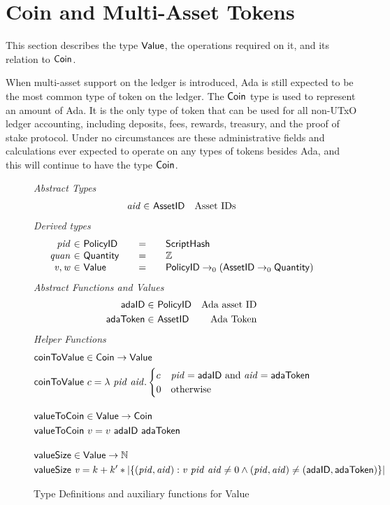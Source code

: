 \section{Coin and Multi-Asset Tokens}
\label{sec:coin-ma}

This section describes the type $\mathsf{Value}$, the operations required on
it, and its relation to $\mathsf{Coin}$.

When multi-asset support on the ledger is introduced, Ada is still expected to be
the most common type of token on the ledger.
The $\mathsf{Coin}$ type is used to represent an amount of Ada.
It is the only
type of token that can be used for all non-UTxO ledger accounting, including deposits,
fees, rewards, treasury, and the proof of stake protocol. Under no circumstances
are these administrative fields and calculations ever expected to operate on
any types of tokens besides Ada, and this will continue to have the type $\mathsf{Coin}$.

\begin{figure*}[t!]
  \emph{Abstract Types}
  \begin{align*}
    \mathit{aid} \in& ~\mathsf{AssetID} & \text{Asset IDs}
  \end{align*}
  \emph{Derived types}
  \begin{equation*}
    \begin{array}{r@{~\in~}l@{\qquad=\qquad}lr}
      \var{pid} & \PolicyID & \ScriptHash \\
      \var{quan} & \Quantity & \Z \\
      \var{v}, \var{w} & \Value
      & \PolicyID \to_0 ( \AssetID \to_0 \Quantity )
    \end{array}
  \end{equation*}
  \emph{Abstract Functions and Values}
  \begin{align*}
    \mathsf{adaID} \in& ~\mathsf{PolicyID}
    & \text{Ada asset ID} \\
    \mathsf{adaToken} \in& ~\mathsf{AssetID}
    & \text{Ada Token}
  \end{align*}
  \emph{Helper Functions}
  \begin{align*}
    & \fun{coinToValue} \in \Coin\to \Value \\
    & \fun{coinToValue}~c = \lambda~\var{pid}~\var{aid}.
      \begin{cases}
        c & \var{pid} = \mathsf{adaID}~\text{and}~\var{aid} = \mathsf{adaToken} \\
        0 & \text{otherwise}
      \end{cases}
    \nextdef
    & \fun{valueToCoin} \in \Value \to \Coin \\
    & \fun{valueToCoin}~v = v~\mathsf{adaID}~\mathsf{adaToken}
    \nextdef
    & \fun{valueSize} \in \Value \to \N \\
    & \fun{valueSize}~\var{v} = k + k' * |\{ (\var{pid}, \var{aid}) : \var{v}~\var{pid}~\var{aid} \neq 0
      \land (\var{pid}, \var{aid}) \neq (\mathsf{adaID}, \mathsf{adaToken}) \}|
  \end{align*}
  \caption{Type Definitions and auxiliary functions for Value}
  \label{fig:defs:value}
\end{figure*}

